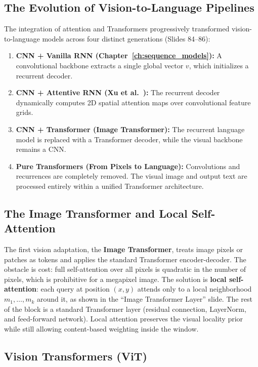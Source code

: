 \subsection{The Evolution of Vision-to-Language Pipelines}

The integration of attention and Transformers progressively transformed vision-to-language models across four distinct generations (Slides 84--86):

\begin{enumerate}[leftmargin=*]
    \item \textbf{CNN + Vanilla RNN (Chapter~\ref{ch:sequence_models}):} A convolutional backbone extracts a single global vector $v$, which initializes a recurrent decoder.
    \item \textbf{CNN + Attentive RNN (Xu et al.~\cite{xu2015show}):} The recurrent decoder dynamically computes 2D spatial attention maps over convolutional feature grids.
    \item \textbf{CNN + Transformer (Image Transformer):} The recurrent language model is replaced with a Transformer decoder, while the visual backbone remains a CNN\@.
    \item \textbf{Pure Transformers (From Pixels to Language):} Convolutions and recurrences are completely removed. The visual image and output text are processed entirely within a unified Transformer architecture.
\end{enumerate}

\subsection{The Image Transformer and Local Self-Attention}

The first vision adaptation, the \textbf{Image Transformer}, treats image pixels or patches as tokens and applies the standard Transformer encoder-decoder. The obstacle is cost: full self-attention over all pixels is quadratic in the number of pixels, which is prohibitive for a megapixel image. The solution is \textbf{local self-attention}: each query at position $(x,y)$ attends only to a local neighborhood $m_1, \dots, m_k$ around it, as shown in the ``Image Transformer Layer'' slide. The rest of the block is a standard Transformer layer (residual connection, LayerNorm, and feed-forward network). Local attention preserves the visual locality prior while still allowing content-based weighting inside the window.

\subsection{Vision Transformers (ViT)}

